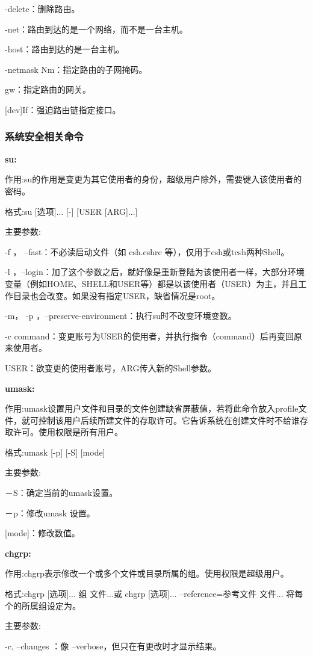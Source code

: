 -delete：删除路由。

-net：路由到达的是一个网络，而不是一台主机。

-host：路由到达的是一台主机。

-netmask Nm：指定路由的子网掩码。

gw：指定路由的网关。

[dev]If：强迫路由链指定接口。

\subsubsection{系统安全相关命令}

\textbf{su:}

作用:su的作用是变更为其它使用者的身份，超级用户除外，需要键入该使用者的密码。

格式:su [选项]... [-] [USER [ARG]...]

主要参数:

-f ， --fast：不必读启动文件（如 csh.cshrc 等），仅用于csh或tcsh两种Shell。

-l ，--login：加了这个参数之后，就好像是重新登陆为该使用者一样，大部分环境变量（例如HOME、SHELL和USER等）都是以该使用者（USER）为主，并且工作目录也会改变。如果没有指定USER，缺省情况是root。

-m， -p ，--preserve-environment：执行su时不改变环境变数。

-c command：变更账号为USER的使用者，并执行指令（command）后再变回原来使用者。

USER：欲变更的使用者账号，ARG传入新的Shell参数。

\textbf{umask:}

作用:umask设置用户文件和目录的文件创建缺省屏蔽值，若将此命令放入profile文件，就可控制该用户后续所建文件的存取许可。它告诉系统在创建文件时不给谁存取许可。使用权限是所有用户。

格式:umask [-p] [-S] [mode]

主要参数:

－S：确定当前的umask设置。

－p：修改umask 设置。

[mode]：修改数值。

\textbf{chgrp:}

作用:chgrp表示修改一个或多个文件或目录所属的组。使用权限是超级用户。

格式:chgrp [选项]... 组 文件...或
chgrp [选项]... --reference=参考文件 文件...
将每个的所属组设定为。

主要参数:

-c, --changes ：像 --verbose，但只在有更改时才显示结果。

